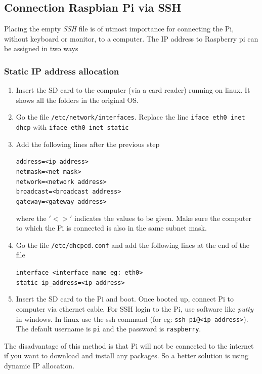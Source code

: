 \documentclass[12pt, a4paper, twoside]{article}
\begin{document}
\subsection{Connection Raspbian Pi via SSH}
	
	Placing the empty \textit{SSH} file is of utmost importance for connecting the Pi, without keyboard or monitor, to a computer. The IP address to Raspberry pi can be assigned in two ways

\subsubsection{Static IP address allocation}
	\begin{enumerate}
		\item Insert the SD card to the computer (via a card reader) running on linux. It shows all the folders in the original OS.
		\item Go the file \texttt{/etc/network/interfaces}. Replace the line \texttt{iface eth0 inet dhcp} with \texttt{iface eth0 inet static}
		\item Add the following lines after the previous step
		
			\texttt{address=<ip address> \\
					netmask=<net mask> \\
					network=<network address> \\
					broadcast=<broadcast address> \\
					gateway=<gateway address>}

		where the $'< >'$ indicates the values to be given. Make sure the computer to which the Pi is connected is also in the same subnet mask.
		\item Go the file \texttt{/etc/dhcpcd.conf} and add the following lines at the end of the file
				
			\texttt{interface <interface name eg: eth0> \\
					static ip\_address=<ip address> }
		\item Insert the SD card to the Pi and boot. Once booted up, connect Pi to computer via ethernet cable. For SSH login to the Pi, use software like \textit{putty} in windows. In linux use the ssh command (for eg: \texttt{ssh pi@<ip address>}). The default username is \texttt{pi} and the password is \texttt{raspberry}.
	\end{enumerate}	

The disadvantage of this method is that Pi will not be connected to the internet if you want to download and install any packages. So a better solution is using dynamic IP allocation.
\end{document}
